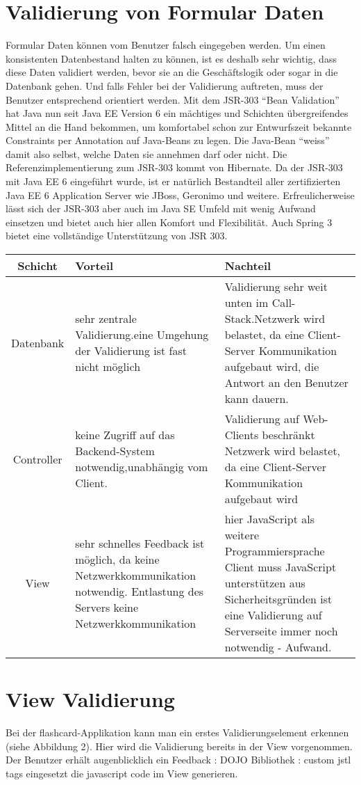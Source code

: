 \documentclass[a4paper,10pt]{scrreprt}
\begin{document}
{\section{Validierung von Formular Daten}
Formular Daten können vom Benutzer falsch eingegeben werden. Um einen konsistenten
Datenbestand halten zu können, ist es deshalb sehr wichtig, dass diese Daten validiert werden,
bevor sie an die Geschäftslogik oder sogar in die Datenbank gehen. Und falls Fehler bei der
Validierung auftreten, muss der Benutzer entsprechend orientiert werden.
Mit dem JSR-303 “Bean Validation” hat Java nun seit Java EE Version 6 ein mächtiges und
Schichten übergreifendes Mittel an die Hand bekommen, um komfortabel schon zur Entwurfszeit
bekannte Constraints per Annotation auf Java-Beans zu legen. Die Java-Bean “weiss” damit also
selbst, welche Daten sie annehmen darf oder nicht. Die Referenzimplementierung zum JSR-303
kommt von Hibernate. Da der JSR-303 mit Java EE 6 eingeführt wurde, ist er natürlich Bestandteil
aller zertifizierten Java EE 6 Application Server wie JBoss, Geronimo und weitere. Erfreulicherweise
lässt sich der JSR-303 aber auch im Java SE Umfeld mit wenig Aufwand einsetzen und bietet auch
hier allen Komfort und Flexibilität. Auch Spring 3 bietet eine vollständige Unterstützung von JSR
303.

\begin{tabular}{|c | p{5cm} | p{5cm} |}
 Schicht & Vorteil & Nachteil \\ \hline
 Datenbank & sehr zentrale Validierung.eine Umgehung der
Validierung ist fast nicht möglich & Validierung sehr weit unten
im Call-Stack.Netzwerk wird belastet, da eine Client-Server Kommunikation aufgebaut
wird, die Antwort an den Benutzer kann dauern. \\ \hline
Controller & keine Zugriff auf das Backend-System notwendig,unabhängig vom Client. &
Validierung auf Web-Clients beschränkt Netzwerk wird belastet, da eine Client-Server Kommunikation aufgebaut
wird \\ \hline
View & sehr schnelles Feedback ist möglich, da keine  Netzwerkkommunikation  notwendig. Entlastung des Servers 
 keine Netzwerkkommunikation & hier JavaScript als weitere Programmiersprache Client muss JavaScript unterstützen
aus Sicherheitsgründen ist eine Validierung auf Serverseite immer noch notwendig - Aufwand. \\ \hline


\end{tabular}

\section{View Validierung} 
Bei der flashcard-Applikation kann man ein erstes Validierungselement erkennen (siehe Abbildung
2). Hier wird die Validierung bereits in der View vorgenommen. Der Benutzer erhält augenblicklich
ein Feedback :
DOJO Bibliothek : custom jstl tags eingesetzt die javascript code im View generieren.

}
\end{document}

